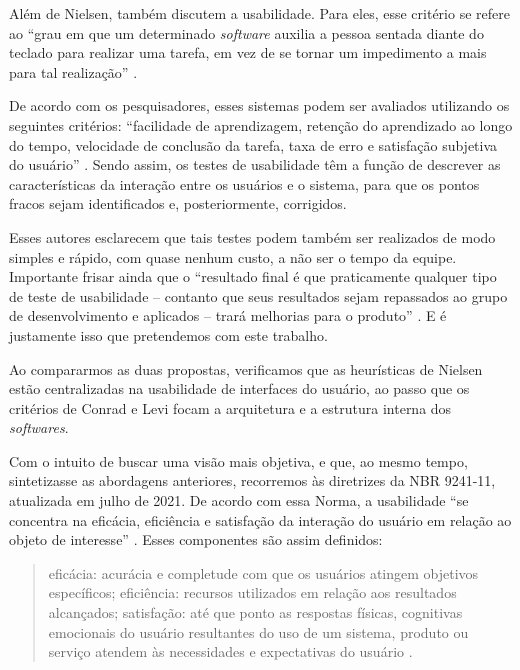 \documentclass[portuguese]{textolivre}
\begin{document}
Além de Nielsen, \textcite{conrad2002} também discutem a usabilidade. Para eles, esse critério se refere ao “grau em que um determinado \textit{software} auxilia a pessoa sentada diante do teclado para realizar uma tarefa, em vez de se tornar um impedimento a mais para tal realização” \cite[p.~1, tradução nossa]{conrad2002}.

De acordo com os pesquisadores, esses sistemas podem ser avaliados utilizando os seguintes critérios: “facilidade de aprendizagem, retenção do aprendizado ao longo do tempo, velocidade de conclusão da tarefa, taxa de erro e satisfação subjetiva do usuário” \cite[p.~1]{conrad2002}. Sendo assim, os testes de usabilidade têm a função de descrever as características da interação entre os usuários e o sistema, para que os pontos fracos sejam identificados e, posteriormente, corrigidos.

Esses autores esclarecem que tais testes podem também ser realizados de modo simples e rápido, com quase nenhum custo, a não ser o tempo da equipe. Importante frisar ainda que o “resultado final é que praticamente qualquer tipo de teste de usabilidade -- contanto que seus resultados sejam repassados ao grupo de desenvolvimento e aplicados -- trará melhorias para o produto” \cite[p.~2, tradução nossa]{conrad2002}. E é justamente isso que pretendemos com este trabalho.

Ao compararmos as duas propostas, verificamos que as heurísticas de Nielsen estão centralizadas na usabilidade de interfaces do usuário, ao passo que os critérios de Conrad e Levi focam a arquitetura e a estrutura interna dos \textit{softwares}.

Com o intuito de buscar uma visão mais objetiva, e que, ao mesmo tempo, sintetizasse as abordagens anteriores, recorremos às diretrizes da NBR 9241-11, atualizada em julho de 2021. De acordo com essa Norma, a usabilidade “se concentra na eficácia, eficiência e satisfação da interação do usuário em relação ao objeto de interesse” \cite[p.~10]{abnt2021}. Esses componentes são assim definidos:

\begin{quote}
    eficácia: acurácia e completude com que os usuários atingem objetivos específicos; eficiência: recursos utilizados em relação aos resultados alcançados; satisfação: até que ponto as respostas físicas, cognitivas emocionais do usuário resultantes do uso de um sistema, produto ou serviço atendem às necessidades e expectativas do usuário \cite[p.~4]{abnt2021}.
\end{quote}
\end{document}
